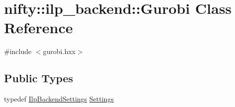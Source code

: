 \hypertarget{classnifty_1_1ilp__backend_1_1Gurobi}{}\section{nifty\+:\+:ilp\+\_\+backend\+:\+:Gurobi Class Reference}
\label{classnifty_1_1ilp__backend_1_1Gurobi}


{\ttfamily \#include $<$gurobi.\+hxx$>$}

\subsection*{Public Types}
\begin{DoxyCompactItemize}
\item 
typedef \hyperlink{structnifty_1_1ilp__backend_1_1IlpBackendSettings}{Ilp\+Backend\+Settings} \hyperlink{classnifty_1_1ilp__backend_1_1Gurobi_ae07f9785d50e89fef9df8ac94eba5010}{Settings}
\end{DoxyCompactItemize}
